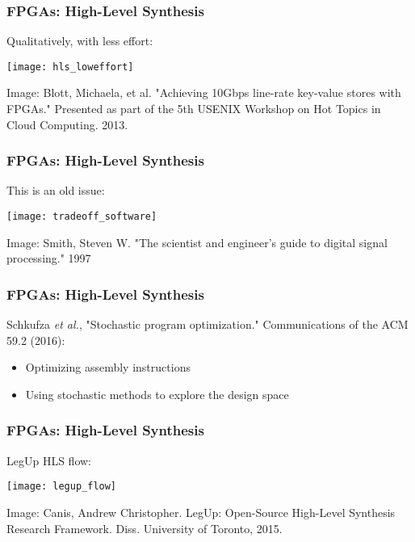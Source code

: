 \documentclass[10pt, compress, xcolor={table,xcdraw,usenames}, aspectratio=169]{beamer}
\begin{document}
\begin{frame}
    \frametitle{FPGAs: High-Level Synthesis}
    \begin{block}{\alert{Qualitatively}, with \alert{less effort}:}
    \begin{center}
        \texttt{[image: hls\_loweffort]}

        \scriptsize{Image: Blott, Michaela, et al. "Achieving 10Gbps line-rate
        key-value stores with FPGAs." Presented as part of the 5th USENIX
        Workshop on Hot Topics in Cloud Computing. 2013.}
    \end{center}
    \end{block}
\end{frame}

\begin{frame}
    \frametitle{FPGAs: High-Level Synthesis}
    \begin{block}{This is an \alert{old issue}:}
    \begin{center}
        \texttt{[image: tradeoff\_software]}

        \scriptsize{Image: Smith, Steven W. "The scientist and engineer's guide
        to digital signal processing." 1997}
    \end{center}
    \end{block}
\end{frame}

\begin{frame}
    \frametitle{FPGAs: High-Level Synthesis}
    \alert{Schkufza \emph{et al.}}, "Stochastic program optimization."
    Communications of the ACM 59.2 (2016):

    \begin{itemize}
        \item Optimizing \alert{assembly instructions}
        \item Using \alert{stochastic methods} to \alert{explore the design space}
    \end{itemize}
\end{frame}

\begin{frame}
    \frametitle{FPGAs: High-Level Synthesis}
    \begin{block}{\alert{LegUp} HLS flow:}
    \begin{center}
        \texttt{[image: legup\_flow]}

        \scriptsize{Image: Canis, Andrew Christopher. LegUp: Open-Source
        High-Level Synthesis Research Framework. Diss. University of Toronto,
        2015.}
    \end{center}
    \end{block}
\end{frame}
\end{document}
